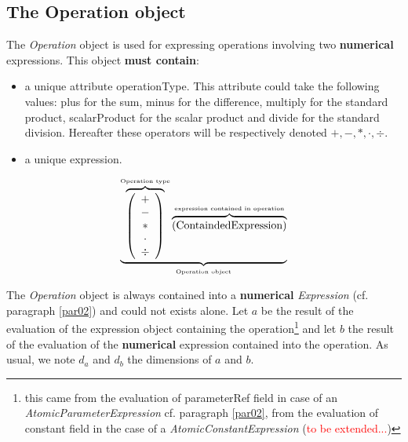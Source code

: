 \documentclass[a4paper,11pt] {article}
\begin{document}
\subsection{The Operation object}\label{par02_02}
The {\it Operation} object is used for expressing operations involving two {\bf numerical} expressions. This object {\bf must contain}:
\begin{itemize}
\item a unique attribute operationType. This attribute could take the following values: plus for the sum, minus for the difference, multiply for the standard product, scalarProduct for the scalar product and divide for the standard division. Hereafter these operators will be respectively denoted $+,-,\ast,\cdot, \div$. 
\item a unique expression.
\end{itemize}
\begin{equation}\label{OperationEquation}
\underbrace{ \overbrace{\left( \begin{array}{c} + \\ - \\ \ast  \\ \cdot \\ \div   \end{array} \right) }^{\mbox{\tiny Operation type}}
 \overbrace{    \left( \mbox{ContaindedExpression}\right) }^{\mbox{\tiny expression contained in operation}}   }_{\mbox{\tiny Operation object}}
\end{equation}

The {\it Operation} object is always contained into a {\bf numerical} {\it Expression} (cf. paragraph \ref{par02}) and could not exists alone.
Let $a$ be the result of the evaluation of the expression object containing the operation\footnote{this came from the evaluation of parameterRef field in case of an {\it AtomicParameterExpression} cf. paragraph \ref{par02}, from the evaluation of constant field in the case of a {\it AtomicConstantExpression} (\textcolor{red}{to be extended...})} and let $b$ the result of the evaluation of the {\bf numerical} expression contained into the operation. As usual, we note $d_a$ and $d_b$ the dimensions of $a$ and $b$.\\
\end{document}
